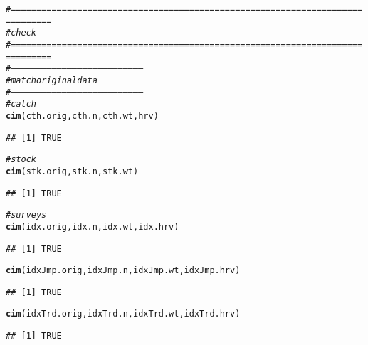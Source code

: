 \documentclass[a4paper,english,10pt]{article}\usepackage[]{graphicx}\usepackage[]{color}
\makeatletter
\newcommand{\hlcom}[1]{\textcolor[rgb]{0.678,0.584,0.686}{\textit{#1}}}%
\newcommand{\hlstd}[1]{\textcolor[rgb]{0.345,0.345,0.345}{#1}}%
\newcommand{\hlkwd}[1]{\textcolor[rgb]{0.737,0.353,0.396}{\textbf{#1}}}%
\newenvironment{kframe}{%
 \def\at@end@of@kframe{}%
 \ifinner\ifhmode%
  \def\at@end@of@kframe{\end{minipage}}%
  \begin{minipage}{\columnwidth}%
 \fi\fi%
 \def\FrameCommand##1{\hskip\@totalleftmargin \hskip-\fboxsep
 \colorbox{shadecolor}{##1}\hskip-\fboxsep
     \hskip-\linewidth \hskip-\@totalleftmargin \hskip\columnwidth}%
 \MakeFramed {\advance\hsize-\width
   \@totalleftmargin\z@ \linewidth\hsize
   \@setminipage}}%
 {\par\unskip\endMakeFramed%
 \at@end@of@kframe}
\newenvironment{knitrout}{}{} %
\makeatother
\begin{document}
\begin{knitrout}
\color{fgcolor}\begin{kframe}
\begin{alltt}
\hlcom{# ==============================================================================}
\hlcom{# check}
\hlcom{# ==============================================================================}
\hlcom{# ------------------------------------------------------------------------------}
\hlcom{# match original data}
\hlcom{# ------------------------------------------------------------------------------}
\hlcom{# catch}
\hlkwd{cim}\hlstd{(cth.orig, cth.n, cth.wt, hrv)}
\end{alltt}
\begin{verbatim}
## [1] TRUE
\end{verbatim}
\begin{alltt}
\hlcom{# stock}
\hlkwd{cim}\hlstd{(stk.orig, stk.n, stk.wt)}
\end{alltt}
\begin{verbatim}
## [1] TRUE
\end{verbatim}
\begin{alltt}
\hlcom{# surveys}
\hlkwd{cim}\hlstd{(idx.orig, idx.n, idx.wt, idx.hrv)}
\end{alltt}
\begin{verbatim}
## [1] TRUE
\end{verbatim}
\begin{alltt}
\hlkwd{cim}\hlstd{(idxJmp.orig, idxJmp.n, idxJmp.wt, idxJmp.hrv)}
\end{alltt}
\begin{verbatim}
## [1] TRUE
\end{verbatim}
\begin{alltt}
\hlkwd{cim}\hlstd{(idxTrd.orig, idxTrd.n, idxTrd.wt, idxTrd.hrv)}
\end{alltt}
\begin{verbatim}
## [1] TRUE
\end{verbatim}
\end{kframe}
\end{knitrout}




\end{document}
